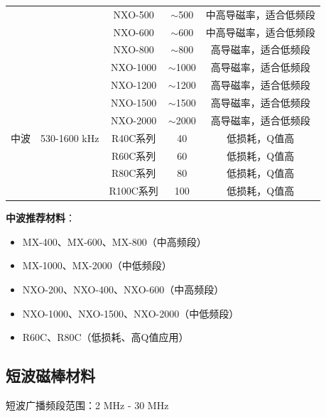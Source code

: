 \begin{center}
\begin{tabular}{|c|c|c|c|c|}
 & & NXO-500 & $\sim$500 & 中高导磁率，适合低频段 \\
 & & NXO-600 & $\sim$600 & 中高导磁率，适合低频段 \\
 & & NXO-800 & $\sim$800 & 高导磁率，适合低频段 \\
 & & NXO-1000 & $\sim$1000 & 高导磁率，适合低频段 \\
 & & NXO-1200 & $\sim$1200 & 高导磁率，适合低频段 \\
 & & NXO-1500 & $\sim$1500 & 高导磁率，适合低频段 \\
 & & NXO-2000 & $\sim$2000 & 高导磁率，适合低频段 \\
\hline
中波 & 530-1600 kHz & R40C系列 & 40 & 低损耗，Q值高 \\
 & & R60C系列 & 60 & 低损耗，Q值高 \\
 & & R80C系列 & 80 & 低损耗，Q值高 \\
 & & R100C系列 & 100 & 低损耗，Q值高 \\
\hline
\end{tabular}
\end{center}

\textbf{中波推荐材料}：
\begin{itemize}
    \item MX-400、MX-600、MX-800（中高频段）
    \item MX-1000、MX-2000（中低频段）
    \item NXO-200、NXO-400、NXO-600（中高频段）
    \item NXO-1000、NXO-1500、NXO-2000（中低频段）
    \item R60C、R80C（低损耗、高Q值应用）
\end{itemize}

\subsection{短波磁棒材料}
\label{sec:sw_magnetic_materials}

短波广播频段范围：2 MHz - 30 MHz

